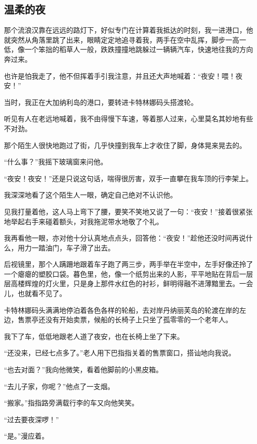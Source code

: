 \subsection{温柔的夜}

\par 那个流浪汉靠在远远的路灯下，好似专门在计算着我抵达的时刻，我一进港口，他就突然从角落里跳了出来，眼睛定定地追寻着我，两手在空中乱挥，脚步一高一低，像一个笨拙的稻草人一般，跌跌撞撞地跳躲过一辆辆汽车，快速地往我的方向奔过来。
\par 也许是怕我走了，他不但挥着手引我注意，并且还大声地喊着：“夜安！喂！夜安！”
\par 当时，我正在大加纳利岛的港口，要转进卡特林娜码头搭渡轮。
\par 听见有人在老远地喊着，我不由得慢下车速，等着那人过来，心里莫名其妙地有些不对劲。
\par 那个陌生人很快地跑过了街，几乎快撞到我车上才收住了脚，身体晃来晃去的。
\par “什么事？”我摇下玻璃窗来问他。
\par “夜安！夜安！”还是只说这句话，喘得很厉害，双手一直攀在我车顶的行李架上。
\par 我深深地看了这个陌生人一眼，确定自己绝对不认识他。
\par 见我打量着他，这人马上弯下了腰，要笑不笑地又说了一句：“夜安！”接着很紧张地举起右手来碰着额头，对我拖泥带水地敬了个礼。
\par 我再看他一眼，亦对他十分认真地点点头，回答他：“夜安！”趁他还没时间再说什么，用力一踏油门，车子滑了出去。
\par 后视镜里，那个人蹒跚地跟着车子跑了两三步，两手举在半空中，左手好像还拎了一个瘪瘪的塑胶口袋。暮色里，他，像一个纸剪出来的人影，平平地贴在背后一层层高楼辉煌的灯火里，只是身上那件水红色的衬衫，鲜明得融不进薄黯里去。一会儿，也就看不见了。
\par 卡特林娜码头满满地停泊着各色各样的轮船，去对岸丹纳丽芙岛的轮渡在岸的左边，售票亭还没有开始卖票，候船的长椅子上只坐了孤零零的一个老年人。
\par 我下了车，低低地跟老人道了夜安，也在长椅上坐了下来。
\par “还没来，已经七点多了。”老人用下巴指指关着的售票窗口，搭讪地向我说。
\par “也去对面？”我向他微笑，看着他脚前的小黑皮箱。
\par “去儿子家，你呢？”他点了一支烟。
\par “搬家。”指指路旁满载行李的车又向他笑笑。
\par “过去要夜深啰！”
\par “是。”漫应着。
